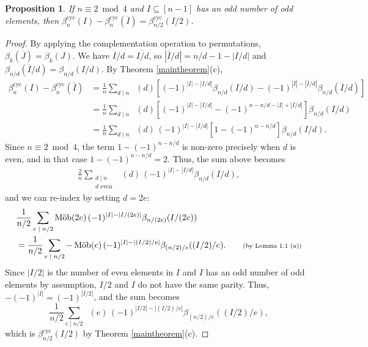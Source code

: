 \documentclass[12pt]{article}
\newcommand{\since}[1]{\tag*{\scriptsize{(#1)}}}
\newcommand{\betacyc}{\beta^{\text{cyc}}}
\DeclareMathOperator{\mob}{M\ddot{o}b}
\newtheorem{prop}[thm]{Proposition}
\theoremstyle{definition}
\begin{document}
\begin{prop} \label{complement} If $n \equiv 2\bmod 4$ and $I \subseteq [n-1]$ has an odd number of odd elements, then $\betacyc_n(I) - \betacyc_n(\overline{I}) = \betacyc_{n/2}(I/2)$.
\end{prop}

\begin{proof}
By applying the complementation operation to permutations, $\beta_k(\overline{J}) = \beta_k(J)$. We have $\overline{I}/d = \overline{I/d}$, so $|\overline{I}/d| = n/d - 1 - |I/d|$ and $\beta_{n/d}(\overline{I}/d) = \beta_{n/d}(I/d)$. By Theorem \ref{maintheorem}(c),
\begin{align*}
\betacyc_n(I) - \betacyc_n(\overline{I}) &= \frac{1}{n} \sum_{\text{$d \mid n$}} \mob(d) \left[ (-1)^{|I| - |I/d|} \beta_{n/d}(I/d) - (-1)^{|\overline{I}| - |\overline{I}/d|} \beta_{n/d}(\overline{I}/d) \right] \\
&= \frac{1}{n} \sum_{\text{$d \mid n$}} \mob(d) \left[ (-1)^{|I| - |I/d|} - (-1)^{n - n/d - |I| + |I/d|} \right] \beta_{n/d}(I/d) \\
&= \frac{1}{n} \sum_{\text{$d \mid n$}} \mob(d)\, (-1)^{|I| - |I/d|} \left[ 1 - (-1)^{n - n/d} \right] \beta_{n/d}(I/d).
\end{align*}
Since $n \equiv 2\bmod 4$, the term $1 - (-1)^{n - n/d}$ is non-zero precisely when $d$ is even, and in that case $1 - (-1)^{n - n/d} = 2$. Thus, the sum above becomes
\begin{align*}
\frac{2}{n} \sum_{\substack{\text{$d \mid n$} \\ \text{$d$ even}}} \mob(d) \,(-1)^{|I| - |I/d|} \beta_{n/d}(I/d), \end{align*}
and we can re-index by setting $d = 2e$:
\begin{align*}
& \frac{1}{n/2} \sum_{\text{$e \mid n/2$}} \mob(2e) \,(-1)^{|I| - |I/(2e)|} \beta_{n/(2e)}(I/(2e)) \\
&= \frac{1}{n/2} \sum_{\text{$e \mid n/2$}} -\mob(e) \,(-1)^{|I| - |(I/2)/e|} \beta_{(n/2)/e}((I/2)/e). \since{by Lemma 1.1 (a)}
\end{align*}
Since $|I/2|$ is the number of even elements in $I$ and $I$ has an odd number of odd elements by assumption, $I/2$ and $I$ do not have the same parity. Thus, $-(-1)^{|I|} = (-1)^{|I/2|}$, and the sum becomes
\[ \frac{1}{n/2} \sum_{\text{$e \mid n/2$}} \mob(e) \,(-1)^{|I/2| - |(I/2)/e|} \beta_{(n/2)/e}((I/2)/e), \]
which is $\betacyc_{n/2}(I/2)$ by Theorem \ref{maintheorem}(c).
\end{proof}
\end{document}
